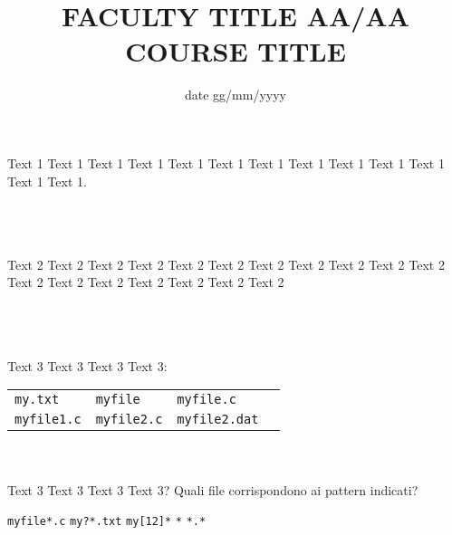 \documentclass[9pt]{exam}
\title{\vspace{-1em}FACULTY TITLE AA/AA\\\Large{COURSE TITLE}\vspace{-2.4em}}
\date{date gg/mm/yyyy\vspace{-1.5em}}
\begin{document}
\maketitle

\begin{center}
\end{center}



\begin{questions}

\question
    Text 1 Text 1 Text 1 Text 1 Text 1 Text 1 Text 1 Text 1 Text 1 Text 1
    Text 1 Text 1 Text 1.\\\\
    \makebox[0.9\textwidth]{\$ \enspace\hrulefill}\\\\
    \makebox[0.9\textwidth]{\enspace\hrulefill}

\question
    Text 2 Text 2 Text 2 Text 2 Text 2 Text 2 Text 2 Text 2 Text 2
    Text 2 Text 2 Text 2 Text 2 Text 2 Text 2 Text 2 Text 2 Text 2\\\\
    \makebox[0.9\textwidth]{\$ \enspace\hrulefill}\\\\
    \makebox[0.9\textwidth]{\enspace\hrulefill}

\question
    Text 3 Text 3 Text 3 Text 3:\\
    \begin{tabular}{llll}
        \hline
        \texttt{my.txt} & \texttt{myfile} & \texttt{myfile.c}\\
        \texttt{myfile1.c} & \texttt{myfile2.c} & \texttt{myfile2.dat} \\
        \hline
    \end{tabular}\\\\
    Text 3 Text 3 Text 3 Text 3?
    Quali file corrispondono ai pattern indicati?
    \begin{checkboxes}
        \choice \texttt{myfile*.c} \quad \makebox[0.6\textwidth]{\$ \enspace\hrulefill}
        \choice \texttt{my?*.txt}  \quad \makebox[0.6\textwidth]{\$ \enspace\hrulefill}
        \choice \texttt{my[12]*}   \quad \makebox[0.6\textwidth]{\$ \enspace\hrulefill}
        \choice \texttt{*}         \quad \makebox[0.6\textwidth]{\$ \enspace\hrulefill}
        \choice \texttt{*.*}       \quad \makebox[0.6\textwidth]{\$ \enspace\hrulefill}
    \end{checkboxes}


\end{questions}
\end{document}
